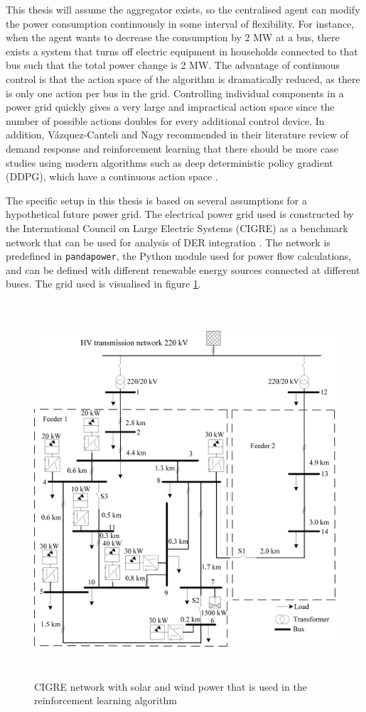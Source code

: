 \documentclass[class=book, crop=false, 11pt]{standalone}
\begin{document}
This thesis will assume the aggregator exists, so the centralised agent can modify the power consumption continuously in some interval of flexibility. For instance, when the agent wants to decrease the consumption by 2 MW at a bus, there exists a system that turns off electric equipment in households connected to that bus such that the total power change is 2 MW.  The advantage of continuous control is that the action space of the algorithm is dramatically reduced, as there is only one action per bus in the grid. Controlling individual components in a power grid quickly gives a very large and impractical action space since the number of possible actions doubles for every additional control device. In addition, Vázquez-Canteli and Nagy recommended in their literature review of demand response and reinforcement learning that there should be more case studies using modern algorithms such as deep deterministic policy gradient (DDPG), which have a continuous action space \cite{vazquez2019reinforcement}.


The specific setup in this thesis is based on several assumptions for a hypothetical future power grid. The electrical power grid used is constructed by the International Council on Large Electric Systems (CIGRE) as a benchmark network that can be used for analysis of DER integration \cite{cigre}. The network is predefined in \texttt{pandapower}, the Python module used for power flow calculations, and can be defined with different renewable energy sources connected at different buses. The grid used is visualised in figure \ref{fig:problem:cigre_network}. 

\begin{figure}[ht]
    \center
    \includegraphics[height=14cm, width=13.5cm]{figures/cigre_network_mv_der.png}
    \caption[size = 9]{CIGRE network with solar and wind power that is used in the reinforcement learning algorithm \cite{cigre}}
    \label{fig:problem:cigre_network}
\end{figure}
\end{document}
